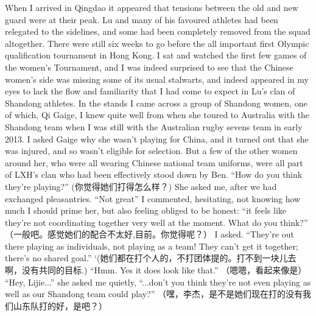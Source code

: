 \begin{CJK}{UTF8}{gbsn}
  When I arrived in Qingdao it appeared that tensions between the old and new guard were at their peak.  Lu and many of his favoured athletes had been relegated to the sidelines, and some had been completely removed from the squad altogether.  There were still six weeks to go before the all important first Olympic qualification tournament in Hong Kong.  I sat and watched the first few games of the women's Tournament, and I was indeed surprised to see that the Chinese women's side was missing some of its usual stalwarts, and indeed appeared in my eyes to lack the flow and familiarity that I had come to expect in Lu's clan of Shandong athletes.  In the stands I came across a group of Shandong women, one of which, Qi Gaige, I knew quite well from when she toured to Australia with the Shandong team when I was still with the Australian rugby sevens team in early 2013.  I asked Gaige why she wasn't playing for China, and it turned out that she was injured, and so wasn't eligible for selection.  But a few of the other women around her, who were all wearing Chinese national team uniforms, were all part of LXH's clan who had been effectively stood down by Ben. ``How do you think they're playing?'' (你觉得她们打得怎么样？) She asked me, after we had exchanged pleasantries. ``Not great'' I commented, hesitating, not knowing how much I should prime her, but also feeling obliged to be honest: ``it feels like they’re not coordinating together very well at the moment.  What do you think?'' （一般吧。感觉她们的配合不太好,目前。你觉得呢？） I asked.  ``They’re out there playing as individuals, not playing as a team! They can't get it together; there's no shared goal.'' `(她们都在打个人的，不打团体提的。打不到一块儿去啊，没有共同的目标.)  ``Hmm. Yes it does look like that.'' （嗯嗯，看起来像是） ``Hey, Lijie...'' she asked me quietly, ``...don’t you think they’re not even playing as well as our Shandong team could play?'' （嘿，李杰，是不是她们现在打的没有我们山东队打的好，是吧？）


\end{CJK}
